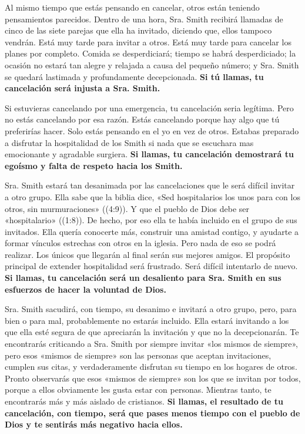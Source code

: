 \documentclass[12pt, twoside, openright]{book}
\begin{document}
Al mismo tiempo que estás pensando en cancelar, otros están teniendo pensamientos parecidos. Dentro de una hora, Sra. Smith recibirá llamadas de cinco de las siete parejas que ella ha invitado, diciendo que, ellos tampoco vendrán. Está muy tarde para invitar a otros. Está muy tarde para cancelar los planes por completo. Comida se desperdiciará; tiempo se habrá desperdiciado; la ocasión no estará tan alegre y relajada a causa del pequeño número; y Sra. Smith se quedará lastimada y profundamente decepcionada. \textbf{Si tú llamas, tu cancelación será injusta a Sra. Smith.}

Si estuvieras cancelando por una emergencia, tu cancelación seria legítima. Pero no estás cancelando por esa razón. Estás cancelando porque hay algo que tú preferirías hacer. Solo estás pensando en el yo en vez de otros. Estabas preparado a disfrutar la hospitalidad de los Smith si nada que se escuchara mas emocionante y agradable surgiera. \textbf{Si llamas, tu cancelación demostrará tu egoísmo y falta de respeto hacia los Smith.}

Sra. Smith estará tan desanimada por las cancelaciones que le será difícil invitar a otro grupo. Ella sabe que la biblia dice, «Sed hospitalarios los unos para con los otros, sin murmuraciones» ((4:9)). Y que el pueblo de Dios debe ser «hospitalario» ((1:8)). De hecho, por eso ella te había incluido en el grupo de sus invitados. Ella quería conocerte más, construir una amistad contigo, y ayudarte a formar vínculos estrechas con otros en la iglesia. Pero nada de eso se podrá realizar. Los únicos que llegarán al final serán sus mejores amigos. El propósito principal de extender hospitalidad será frustrado. Será difícil intentarlo de nuevo. \textbf{Si llamas, tu cancelación será un desaliento para Sra. Smith en sus esfuerzos de hacer la voluntad de Dios.}

Sra. Smith sacudirá, con tiempo, su desanimo e invitará a otro grupo, pero, para bien o para mal, probablemente no estarás incluido. Ella estará invitando a los que ella esté segura de que apreciarán la invitación y que no la decepcionarán. Te encontrarás criticando a Sra. Smith por siempre invitar «los mismos de siempre», pero esos «mismos de siempre» son las personas que aceptan invitaciones, cumplen sus citas, y verdaderamente disfrutan su tiempo en los hogares de otros. Pronto observarás que esos «mismos de siempre» son los que se invitan por todos, porque a ellos obviamente les gusta estar con personas. Mientras tanto, te encontrarás más y más aislado de cristianos. \textbf{Si llamas, el resultado de tu cancelación, con tiempo, será que pases menos tiempo con el pueblo de Dios y te sentirás más negativo hacia ellos.}
\end{document}
